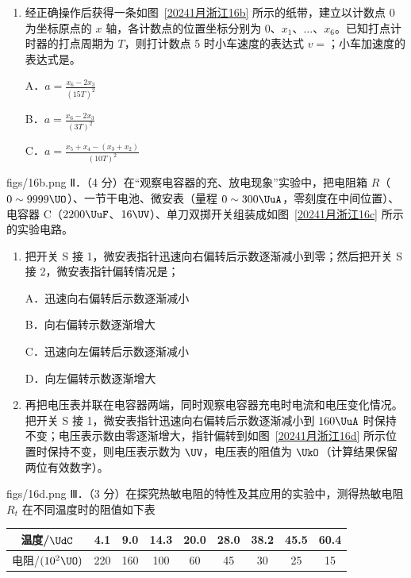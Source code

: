 \documentclass[\gkver]{gaokaozhenti}
\begin{document}
\begin{enumerate}
\begin{enumerate}
	A．用气垫导轨代替普通导轨，滑块代替小车

	B．在小车上加装遮光条，用光电计时系统代替打点计时器

	C．在小车与细绳之间加装力传感器，测出小车所受拉力大小

	\item
	经正确操作后获得一条如图~\ref{20241月浙江16b} 所示的纸带，建立以计数点 0 为坐标原点的 $x$ 轴，各计数点的位置坐标分别为 0、$x_{1}$、$\ldots$、$x_{6}$。已知打点计时器的打点周期为 $T$，则打计数点 5 时小车速度的表达式 $v = $；小车加速度的表达式是。

	A．$a = \frac{x_{6} - 2x_{3}}{(15T)^{2}}$

	B．$a = \frac{x_{6} - 2x_{3}}{(3T)^{2}}$

	C．$a = \frac{x_{5} + x_{4} - (x_{3} + x_{2})}{(10T)^{2}}$
\end{enumerate}
{figs/16b.png}
Ⅱ．（4 分）在“观察电容器的充、放电现象”实验中，把电阻箱 $R$（$0\sim9999\UO$）、一节干电池、微安表（量程 $0\sim300\UuA$，零刻度在中间位置）、电容器 C（$2200\UuF$、$16\UV$）、单刀双掷开关组装成如图~\ref{20241月浙江16c} 所示的实验电路。

\begin{enumerate}
	\item
	把开关 S 接 1，微安表指针迅速向右偏转后示数逐渐减小到零；然后把开关 S 接 2，微安表指针偏转情况是；

	A．迅速向右偏转后示数逐渐减小

	B．向右偏转示数逐渐增大

	C．迅速向左偏转后示数逐渐减小

	D．向左偏转示数逐渐增大

	\item
	再把电压表并联在电容器两端，同时观察电容器充电时电流和电压变化情况。把开关 S 接 1，微安表指针迅速向右偏转后示数逐渐减小到 $160\UuA$ 时保持不变；电压表示数由零逐渐增大，指针偏转到如图~\ref{20241月浙江16d} 所示位置时保持不变，则电压表示数为 $\UV$，电压表的阻值为 $\UkO$（计算结果保留两位有效数字）。
\end{enumerate}
{figs/16d.png}
Ⅲ．（3 分）在探究热敏电阻的特性及其应用的实验中，测得热敏电阻 $R_{t}$ 在不同温度时的阻值如下表

\begin{center}
\begin{tabular}{|c|c|c|c|c|c|c|c|c|}
\hline
温度/$\UdC$ & 4.1 & 9.0 & 14.3 & 20.0 & 28.0 & 38.2 & 45.5 & 60.4 \\ \hline
电阻/$(10^{2}\UO)$ & 220 & 160 & 100 & 60 & 45 & 30 & 25 & 15 \\ \hline
\end{tabular}
\end{center}


\end{enumerate}
\end{document}
